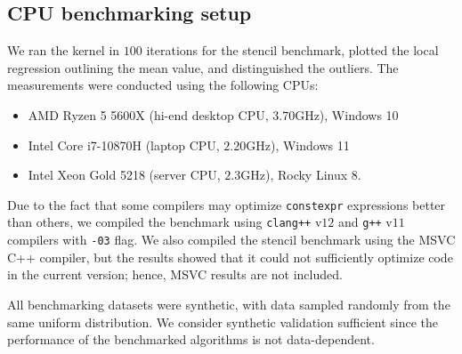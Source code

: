 \subsection{CPU benchmarking setup}

We ran the kernel in $100$ iterations for the stencil benchmark, plotted the local regression outlining the mean value, and distinguished the outliers.
The measurements were conducted using the following CPUs:
\begin{itemize}
    \item AMD Ryzen 5 5600X (hi-end desktop CPU, $3.70$GHz), Windows 10
    \item Intel Core i7-10870H (laptop CPU, $2.20$GHz), Windows 11
    \item Intel Xeon Gold 5218 (server CPU, $2.3$GHz), Rocky Linux 8.
\end{itemize}

Due to the fact that some compilers may optimize \texttt{constexpr} expressions better than others, we compiled the benchmark using \texttt{clang++} v$12$ and \texttt{g++} v$11$ compilers with \texttt{-03} flag.
We also compiled the stencil benchmark using the MSVC C++ compiler, but the results showed that it could not sufficiently optimize \Noarr{} code in the current version; hence, MSVC results are not included.

All benchmarking datasets were synthetic, with data sampled randomly from the same uniform distribution. We consider synthetic validation sufficient since the performance of the benchmarked algorithms is not data-dependent.
